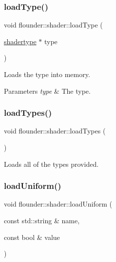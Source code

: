 \subsubsection{\texorpdfstring{load\+Type()}{loadType()}}
{\footnotesize\ttfamily void flounder\+::shader\+::load\+Type (\begin{DoxyParamCaption}\item[{\hyperlink{structflounder_1_1shadertype}{shadertype} $\ast$}]{type }\end{DoxyParamCaption})\hspace{0.3cm}{\ttfamily [private]}}



Loads the type into memory. 


\begin{DoxyParams}{Parameters}
{\em type} & The type. \\
\hline
\end{DoxyParams}
\mbox{\label{classflounder_1_1shader_a6e6e2fb4699edf3e31a2db8cc0537d54}} 
\subsubsection{\texorpdfstring{load\+Types()}{loadTypes()}}
{\footnotesize\ttfamily void flounder\+::shader\+::load\+Types (\begin{DoxyParamCaption}{ }\end{DoxyParamCaption})\hspace{0.3cm}{\ttfamily [private]}}



Loads all of the types provided. 

\mbox{\label{classflounder_1_1shader_a1767f4ca2d3b1eb35dc4435e2aa3fd67}} 
\subsubsection{\texorpdfstring{load\+Uniform()}{loadUniform()}\hspace{0.1cm}{\footnotesize\ttfamily [1/13]}}
{\footnotesize\ttfamily void flounder\+::shader\+::load\+Uniform (\begin{DoxyParamCaption}\item[{const std\+::string \&}]{name,  }\item[{const bool \&}]{value }\end{DoxyParamCaption})}



